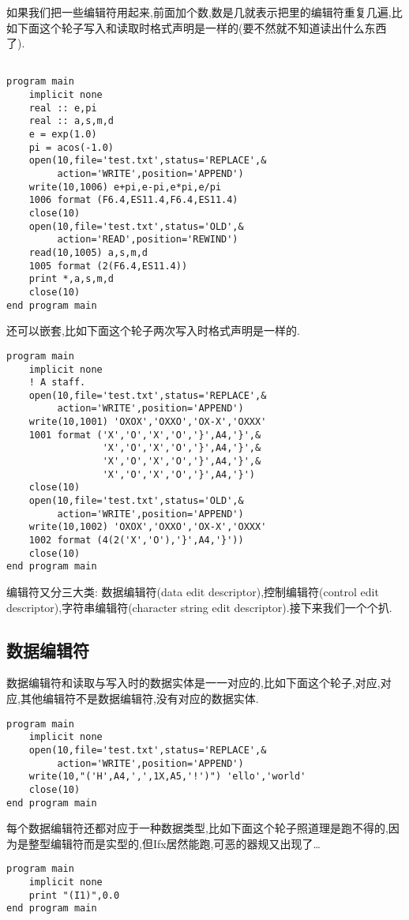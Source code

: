 如果我们把一些编辑符用\ttt{()}起来,前面加个数,数是几就表示把\ttt{()}里的编辑符重复几遍,比如下面这个轮子写入和读取时格式声明是一样的(要不然就不知道读出什么东西了).
\begin{lstlisting}

program main
    implicit none
    real :: e,pi
    real :: a,s,m,d
    e = exp(1.0)
    pi = acos(-1.0)
    open(10,file='test.txt',status='REPLACE',&
         action='WRITE',position='APPEND')
    write(10,1006) e+pi,e-pi,e*pi,e/pi
    1006 format (F6.4,ES11.4,F6.4,ES11.4)
    close(10)
    open(10,file='test.txt',status='OLD',&
         action='READ',position='REWIND')
    read(10,1005) a,s,m,d
    1005 format (2(F6.4,ES11.4))
    print *,a,s,m,d
    close(10)
end program main
\end{lstlisting}
\ttt{()}还可以嵌套,比如下面这个轮子两次写入时格式声明是一样的.
\begin{lstlisting}
program main
    implicit none
    ! A staff.
    open(10,file='test.txt',status='REPLACE',&
         action='WRITE',position='APPEND')
    write(10,1001) 'OXOX','OXXO','OX-X','OXXX'
    1001 format ('X','O','X','O','}',A4,'}',&
                 'X','O','X','O','}',A4,'}',&
                 'X','O','X','O','}',A4,'}',&
                 'X','O','X','O','}',A4,'}')
    close(10)
    open(10,file='test.txt',status='OLD',&
         action='WRITE',position='APPEND')
    write(10,1002) 'OXOX','OXXO','OX-X','OXXX'
    1002 format (4(2('X','O'),'}',A4,'}'))
    close(10)
end program main
\end{lstlisting}

编辑符又分三大类: 数据编辑符(data edit descriptor),控制编辑符(control edit descriptor),字符串编辑符(character string edit descriptor).接下来我们一个个扒.

\subsection{数据编辑符}

数据编辑符和读取与写入时的数据实体是一一对应的,比如下面这个轮子,对应,对应,其他编辑符不是数据编辑符,没有对应的数据实体.
\begin{lstlisting}
program main
    implicit none
    open(10,file='test.txt',status='REPLACE',&
         action='WRITE',position='APPEND')
    write(10,"('H',A4,',',1X,A5,'!')") 'ello','world'
    close(10)
end program main
\end{lstlisting}
每个数据编辑符还都对应于一种数据类型,比如下面这个轮子照道理是跑不得的,因为是整型编辑符而是实型的,但Ifx居然能跑,可恶的器规又出现了\dots
\begin{lstlisting}
program main
    implicit none
    print "(I1)",0.0
end program main
\end{lstlisting}


